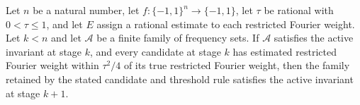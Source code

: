 \begin{theorem}
\label{FABL.goldreichLevinActiveInvariant_retained}
\leanok
{}
Let $n$ be a natural number, let $f:\{-1,1\}^n\to\{-1,1\}$, let $\tau$ be rational with
$0<\tau\le 1$, and let $E$ assign a rational estimate to each restricted Fourier weight.
Let $k<n$ and let $\mathcal A$ be a finite family of frequency sets. If $\mathcal A$
satisfies the active invariant at stage $k$, and every candidate at stage $k$ has
estimated restricted Fourier weight within $\tau^2/4$ of its true restricted Fourier
weight, then the family retained by the stated candidate and threshold rule satisfies
the active invariant at stage $k+1$.
\end{theorem}

